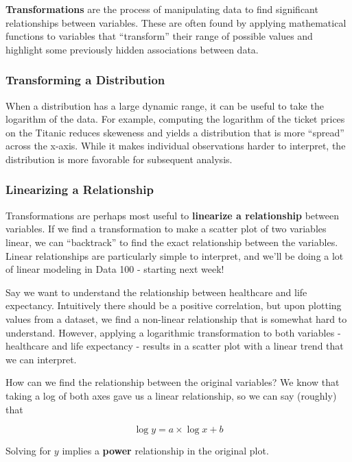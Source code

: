 \documentclass[
  letterpaper,
  DIV=11,
  numbers=noendperiod]{scrreprt}
\begin{document}
\textbf{Transformations} are the process of manipulating data to find
significant relationships between variables. These are often found by
applying mathematical functions to variables that ``transform'' their
range of possible values and highlight some previously hidden
associations between data.

\hypertarget{transforming-a-distribution}{%
\subsubsection{Transforming a
Distribution}\label{transforming-a-distribution}}

When a distribution has a large dynamic range, it can be useful to take
the logarithm of the data. For example, computing the logarithm of the
ticket prices on the Titanic reduces skeweness and yields a distribution
that is more ``spread'' across the x-axis. While it makes individual
observations harder to interpret, the distribution is more favorable for
subsequent analysis.

\hypertarget{linearizing-a-relationship}{%
\subsubsection{Linearizing a
Relationship}\label{linearizing-a-relationship}}

Transformations are perhaps most useful to \textbf{linearize a
relationship} between variables. If we find a transformation to make a
scatter plot of two variables linear, we can ``backtrack'' to find the
exact relationship between the variables. Linear relationships are
particularly simple to interpret, and we'll be doing a lot of linear
modeling in Data 100 - starting next week!

Say we want to understand the relationship between healthcare and life
expectancy. Intuitively there should be a positive correlation, but upon
plotting values from a dataset, we find a non-linear relationship that
is somewhat hard to understand. However, applying a logarithmic
transformation to both variables - healthcare and life expectancy -
results in a scatter plot with a linear trend that we can interpret.

How can we find the relationship between the original variables? We know
that taking a log of both axes gave us a linear relationship, so we can
say (roughly) that

\[\log y= a\times\log x + b\]

Solving for \(y\) implies a \textbf{power} relationship in the original
plot.
\end{document}
